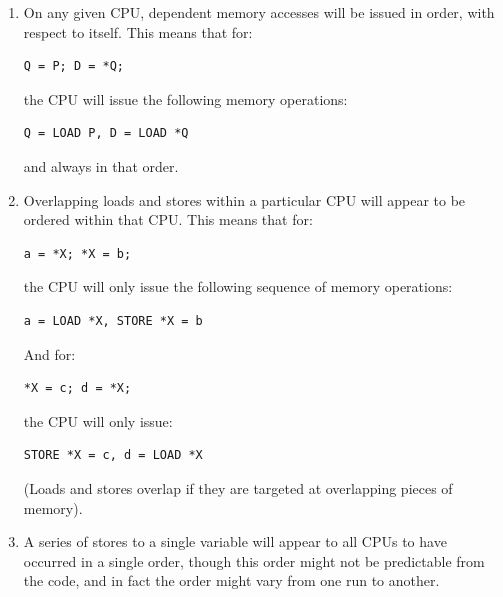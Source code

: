 \begin{enumerate}
\item	On any given CPU, dependent memory accesses will be issued in order,
	with respect to itself.  This means that for:

\begin{minipage}[t]{\columnwidth}
\scriptsize
\begin{verbatim}
Q = P; D = *Q;
\end{verbatim}
\end{minipage}

	the CPU will issue the following memory operations:

\begin{minipage}[t]{\columnwidth}
\scriptsize
\begin{verbatim}
Q = LOAD P, D = LOAD *Q
\end{verbatim}
\end{minipage}

	and always in that order.

\item	Overlapping loads and stores within a particular CPU will appear to be
	ordered within that CPU.  This means that for:

\begin{minipage}[t]{\columnwidth}
\scriptsize
\begin{verbatim}
a = *X; *X = b;
\end{verbatim}
\end{minipage}

	the CPU will only issue the following sequence of memory operations:

\begin{minipage}[t]{\columnwidth}
\scriptsize
\begin{verbatim}
a = LOAD *X, STORE *X = b
\end{verbatim}
\vspace{1pt}
\end{minipage}

	And for:

\begin{minipage}[t]{\columnwidth}
\scriptsize
\begin{verbatim}
*X = c; d = *X;
\end{verbatim}
\end{minipage}

	the CPU will only issue:

\begin{minipage}[t]{\columnwidth}
\scriptsize
\begin{verbatim}
STORE *X = c, d = LOAD *X
\end{verbatim}
\end{minipage}

	(Loads and stores overlap if they are targeted at overlapping pieces of
	memory).
\item	A series of stores to a single variable will appear to all
	CPUs to have occurred in a single order, though this order
	might not be predictable from the code, and in fact the
	order might vary from one run to another.
\end{enumerate}

